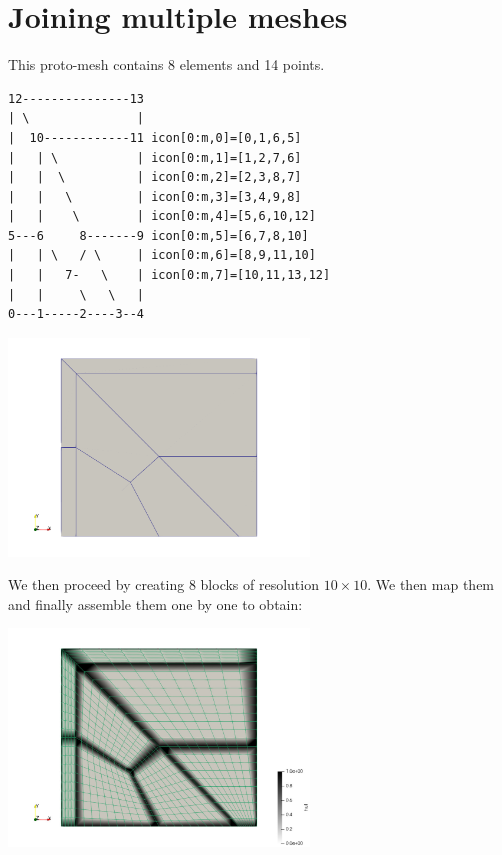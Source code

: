 \section*{Joining multiple meshes}

This proto-mesh contains 8 elements and 14 points.

\begin{verbatim}
12---------------13
| \               |
|  10------------11 icon[0:m,0]=[0,1,6,5]
|   | \           | icon[0:m,1]=[1,2,7,6]
|   |  \          | icon[0:m,2]=[2,3,8,7]
|   |   \         | icon[0:m,3]=[3,4,9,8]
|   |    \        | icon[0:m,4]=[5,6,10,12]
5---6     8-------9 icon[0:m,5]=[6,7,8,10]    
|   | \   / \     | icon[0:m,6]=[8,9,11,10]
|   |   7-   \    | icon[0:m,7]=[10,11,13,12]
|   |     \   \   | 
0---1-----2----3--4
\end{verbatim}

\begin{center}
\includegraphics[width=8cm]{python_codes/fieldstone_149/results/mesh}
\end{center}

We then proceed by creating 8 blocks of resolution $10\times 10$. 
We then map them and finally assemble them one by one to obtain:

\begin{center}
\includegraphics[width=8cm]{python_codes/fieldstone_149/results/vkkmesh}
\end{center}

